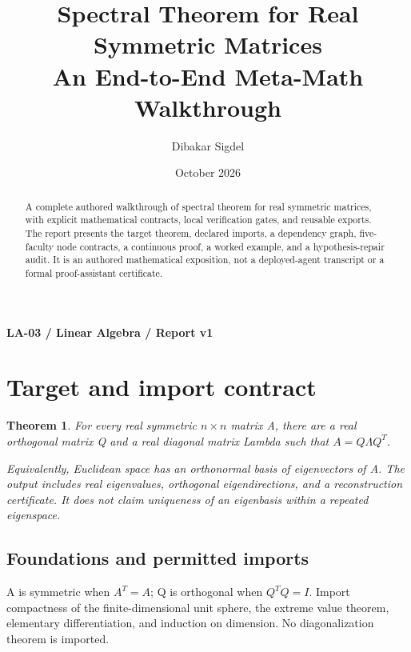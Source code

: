 \documentclass[preprint,12pt,aps,pra,showkeys,amsmath,amssymb,superscriptaddress,floatfix]{revtex4-2}
\newtheorem{theorem}{Theorem}[section]
\theoremstyle{definition}
\theoremstyle{remark}
\begin{document}
\title{Spectral Theorem for Real Symmetric Matrices\\[4pt]\large An End-to-End Meta-Math Walkthrough}

\author{Dibakar Sigdel}


\date{October 2026}

\begin{abstract}

A complete authored walkthrough of spectral theorem for real symmetric
matrices, with explicit mathematical contracts, local verification
gates, and reusable exports. The report presents the target theorem,
declared imports, a dependency graph, five-faculty node contracts, a
continuous proof, a worked example, and a hypothesis-repair audit. It is
an authored mathematical exposition, not a deployed-agent transcript or
a formal proof-assistant certificate.

\end{abstract}\maketitle\linespread{1.12}\selectfont

\noindent\textbf{LA-03 / Linear Algebra / Report v1}

\section{Target and import contract}

\begin{theorem}

For every real symmetric \(n\times n\) matrix A, there are a real
orthogonal matrix Q and a real diagonal matrix Lambda such that
\(A=Q\Lambda Q^T\).

Equivalently, Euclidean space has an orthonormal basis of eigenvectors
of A. The output includes real eigenvalues, orthogonal eigendirections,
and a reconstruction certificate. It does not claim uniqueness of an
eigenbasis within a repeated eigenspace.

\end{theorem}

\subsection{Foundations and permitted imports}

A is symmetric when \(A^{T}=A\); Q is orthogonal when \(Q^{T}Q=I\).
Import compactness of the finite-dimensional unit sphere, the extreme
value theorem, elementary differentiation, and induction on dimension.
No diagonalization theorem is imported.
\end{document}
